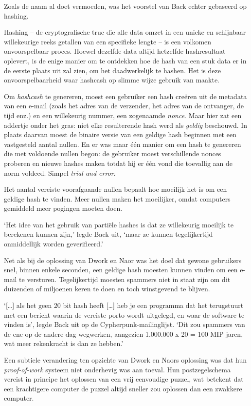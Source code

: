 \documentclass[
  a5paper,
  smalldemyvopaper,11pt,twoside,onecolumn,openright,extrafontsizes,
hidelinks]{memoir}
\begin{document}
Zoals de naam al doet vermoeden, was het voorstel van Back echter
gebaseerd op hashing.

Hashing -- de cryptografische truc die alle data omzet in een unieke en
schijnbaar willekeurige reeks getallen van een specifieke lengte -- is
een volkomen onvoorspelbaar proces. Hoewel dezelfde data altijd
hetzelfde hashresultaat oplevert, is de enige manier om te ontdekken hoe
de hash van een stuk data er in de eerste plaats uit zal zien, om het
daadwerkelijk te hashen. Het is deze onvoorspelbaarheid waar hashcash op
slimme wijze gebruik van maakte.

Om \emph{hashcash} te genereren, moest een gebruiker een hash creëren
uit de metadata van een e-mail (zoals het adres van de verzender, het
adres van de ontvanger, de tijd enz.) en een willekeurig nummer, een
zogenaamde \emph{nonce}. Maar hier zat een addertje onder het gras: niet
elke resulterende hash werd als \emph{geldig} beschouwd. In plaats
daarvan moest de binaire versie van een geldige hash beginnen met een
vastgesteld aantal nullen. En er was maar één manier om een hash te
genereren die met voldoende nullen begon: de gebruiker moest
verschillende nonces proberen en nieuwe hashes maken totdat hij er één
vond die toevallig aan de norm voldeed. Simpel \emph{trial and error}.

Het aantal vereiste voorafgaande nullen bepaalt hoe moeilijk het is om
een geldige hash te vinden. Meer nullen maken het moeilijker, omdat
computers gemiddeld meer pogingen moeten doen.

`Het idee van het gebruik van partiële hashes is dat ze willekeurig
moeilijk te berekenen kunnen zijn,' legde Back uit, `maar ze kunnen
tegelijkertijd onmiddellijk worden geverifieerd.'

Net als bij de oplossing van Dwork en Naor was het doel dat gewone
gebruikers snel, binnen enkele seconden, een geldige hash moesten kunnen
vinden om een e-mail te versturen. Tegelijkertijd moesten spammers niet
in staat zijn om dit duizenden of miljoenen keren te doen en toch
winstgevend te blijven.

`{[}\ldots{]} als het geen 20 bit hash heeft {[}\ldots{]} heb je een
programma dat het terugstuurt met een bericht waarin de vereiste porto
wordt uitgelegd, en waar de software te vinden is', legde Back uit op de
Cypherpunk-mailinglijst. `Dit zou spammers van de ene op de andere dag
wegwerken, aangezien 1.000.000 x 20 = 100 MIP jaren, wat meer
rekenkracht is dan ze hebben.'

Een subtiele verandering ten opzichte van Dwork en Naors oplossing was
dat hun \emph{proof-of-work} systeem niet onderhevig was aan toeval. Hun
postzegelschema vereist in principe het oplossen van een vrij eenvoudige
puzzel, wat betekent dat een krachtigere computer de puzzel altijd
sneller zou oplossen dan een zwakkere computer.
\end{document}
